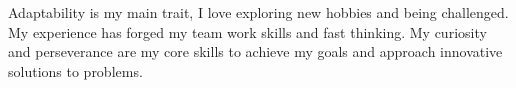 
\begin{cvparagraph}
Adaptability is my main trait, I love exploring new hobbies and being
challenged. My experience has forged my team work skills and fast
thinking.  My curiosity and perseverance are my core skills to achieve
my goals and approach innovative solutions to problems.
\end{cvparagraph}